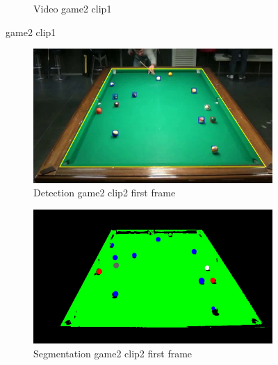 \begin{figure}[H]
\begin{subfigure}[b]{0.48\textwidth}
    	\caption{Video game2 clip1}
    	\label{fig: game2_clip1_video}
    \end{subfigure}
    
	\caption{game2 clip1}
\end{figure}


\begin{figure}[H]
    \centering
    \begin{subfigure}[b]{0.48\textwidth}
        \centering
        \includegraphics[width=\textwidth]{images/Detection/game2_clip2_detected_balls_first_frame.jpg}
        \caption{Detection game2 clip2 first frame}
        \label{fig: game2_clip2_first_frame_detected}
    \end{subfigure}
    \begin{subfigure}[b]{0.48\textwidth}
        \centering
        \includegraphics[width=\textwidth]{images/Segmentation/game2_clip2_segmented_balls_first_frame.jpg}
        \caption{Segmentation game2 clip2 first frame}
		\label{fig: game2_clip2_first_frame_segmented}
    \end{subfigure}
    \begin{subfigure}[b]{0.48\textwidth}

\end{subfigure}
\end{figure}
